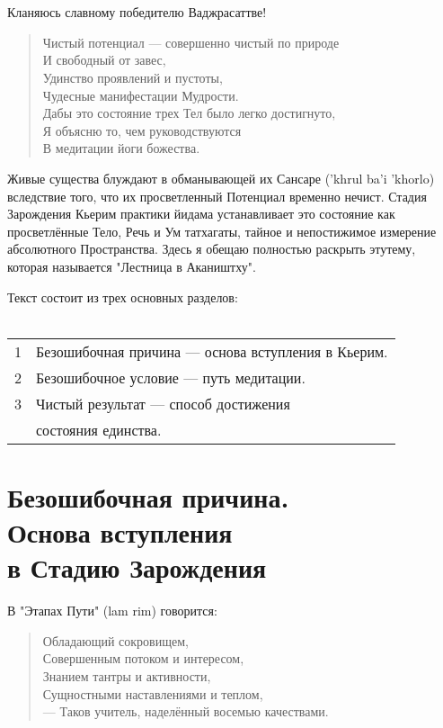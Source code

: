 
\section*{}
Кланяюсь славному победителю Ваджрасаттве!

\begin{verse}
Чистый потенциал — совершенно чистый по природе\\
И свободный от завес,\\
Удинство проявлений и пустоты,\\
Чудесные манифестации Мудрости.\\
Дабы это состояние трех Тел было легко достигнуто,\\
Я объясню то, чем руководствуются\\
В медитации йоги божества.
\end{verse}

Живые существа блуждают в обманывающей их Сансаре ('khrul ba'i 'khorlo)
вследствие того, что их просветленный Потенциал временно нечист.
Стадия Зарождения Кьерим практики йидама устанавливает это
состояние как просветлённые Тело, Речь и Ум татхагаты, тайное
и непостижимое измерение абсо\-лютного Пространства. Здесь я
обещаю полностью раскрыть этутему, которая называется "Лестница в Акаништху".

Текст состоит из трех основных разделов:\\
\\
\begin{tabular}{ll}
1 & Безошибочная причина — основа вступления в Кьерим.\\
2 & Безошибочное условие — путь медитации.\\
3 & Чистый результат — способ достижения \\
  & состояния единства.
\end{tabular}

\newpage
\section{Безошибочная причина.\\Основа вступления \\в Стадию Зарождения}
В "Этапах Пути" (lam rim) говорится:

\begin{verse}
Обладающий сокровищем,\\
Совершенным потоком и интересом,\\
Знанием тантры и активности,\\
Сущностными наставлениями и теплом,\\
— Таков учитель, наделённый восемью качествами.
\end{verse}

